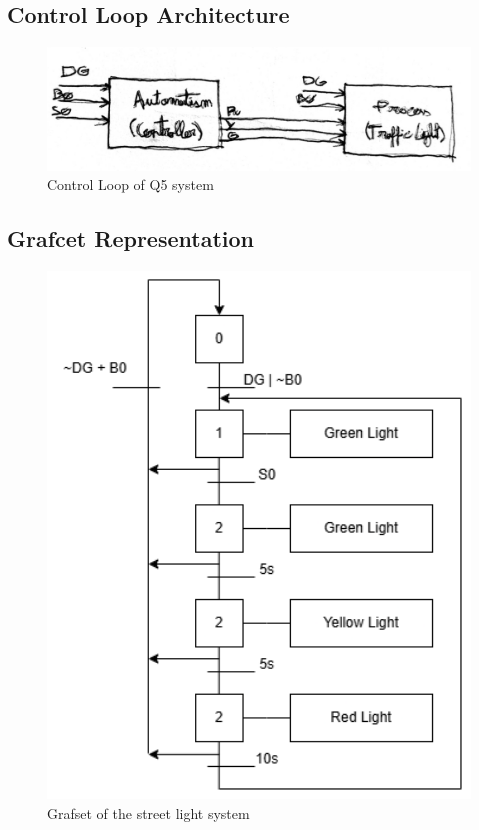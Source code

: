 \subsection{Control Loop Architecture} \label{sec:Control_Loop_Architecture}

\begin{figure}[H]
    \includegraphics[width=16cm]{Images/Q5/Q5_control.jpeg}
    \centering
    \caption{Control Loop of Q5 system}
    \label{fig:Q5_control}
\end{figure}

\subsection{Grafcet Representation} \label{sec:Grafcet_Representation}

\begin{figure}[H]
    \includegraphics[width=16cm]{Images/Q5/graftset.png}
    \centering
    \caption{Grafset of the street light system}
    \label{fig:grafset}
\end{figure}


